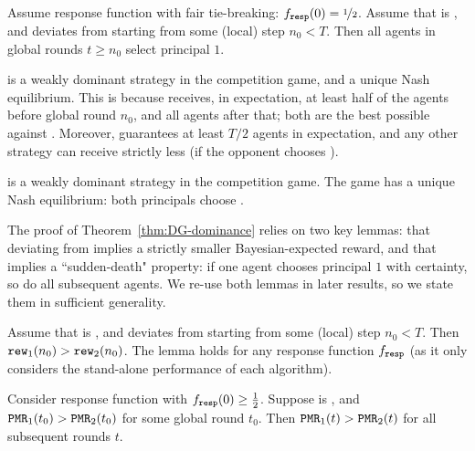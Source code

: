 \begin{theorem}\label{thm:DG-dominance}
Assume \HardMax response function with fair tie-breaking: $f_{\mathtt{resp}}(0)=\nicefrac{1}{2}$. Assume that \alg[1] is \DynGreedy, and \alg[2] deviates from \DynGreedy starting from some (local) step $n_0<T$. Then all agents in global rounds $t\geq n_0$ select principal $1$.
\end{theorem}

\DynGreedy is a weakly dominant strategy in the competition game, and a unique Nash equilibrium.  This is because \DynGreedy receives, in expectation, at least half of the agents before global round $n_0$, and all agents after that; both are the best possible against \alg[2]. Moreover, \DynGreedy guarantees at least $T/2$ agents in expectation, and any other strategy can receive strictly less (\eg if the opponent chooses \DynGreedy).


\begin{corollary}\label{cor:DG-dominance}
\DynGreedy is a weakly dominant strategy in the competition game. The game has a unique Nash equilibrium: both principals choose \DynGreedy.
\end{corollary}

The proof of Theorem~\ref{thm:DG-dominance} relies on two key lemmas: that deviating from \DynGreedy implies a strictly smaller Bayesian-expected reward, and that \HardMax implies a ``sudden-death" property: if one agent chooses principal $1$ with certainty, so do all subsequent agents. We re-use both lemmas in later results, so we state them in sufficient generality.


\begin{lemma}\label{lm:DG-rew}
Assume that \alg[1] is \DynGreedy, and \alg[2] deviates from \DynGreedy starting from some (local) step $n_0<T$. Then $\mathtt{rew}_1(n_0)>\mathtt{rew}_2(n_0)$. The lemma holds for any response function $f_{\mathtt{resp}}$ (as it only considers the stand-alone performance of each algorithm).
\end{lemma}

\begin{lemma}\label{lm:DG-sudden}
Consider \HardMax response function with $f_{\mathtt{resp}}(0)\geq\tfrac12$.
Suppose \alg[1] is \bmonotone, and $\mathtt{PMR}_1(t_0)>\mathtt{PMR}_2(t_0)$ for some global round $t_0$. Then $\mathtt{PMR}_1(t)>\mathtt{PMR}_2(t)$ for all subsequent rounds $t$.
\end{lemma}

